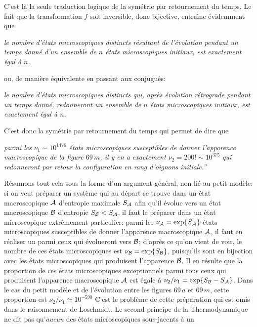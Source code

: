 C'est l\`a la seule traduction logique de la sym\'etrie par retournement 
du temps. Le fait que la transformation $f$ soit inversible, donc 
bijective, entra{\^\i}ne \'evidemment que 
\smallskip
{\sl
\noindent le nombre d'\'etats microscopiques distincts r\'esultant de 
l'\'evolution pendant un temps donn\'e d'un ensemble 
de $n$ \'etats microscopiques initiaux, est exactement \'egal \`a $n$.\par }
\medskip 
\noindent ou, de mani\`ere \'equivalente en passant aux conjugu\'es:
\smallskip
{\sl
\noindent le nombre d'\'etats microscopiques distincts qui, apr\`es 
\'evolution r\'etrograde pendant un temps donn\'e, redonneront un ensemble 
de $n$ \'etats microscopiques initiaux, est exactement \'egal \`a $n$. \par }
\medskip
C'est donc la sym\'etrie par retournement du temps qui permet de dire que
\smallskip
{\sl \noindent
parmi les $\nu_1 \sim 10^{1476}$ \'etats microscopiques susceptibles de
donner l'apparence macroscopique de la figure $69\, m$, il y en a exactement 
$\nu_2 = 200! \sim 10^{375}$ qui redonneront par retour la configuration 
en rang d'oignons initiale.''\par }
\medskip  
R\'esumons tout cela sous la forme d'un argument g\'en\'eral, non li\'e 
au petit mod\`ele: 
si on veut pr\'eparer un syst\`eme qui au d\'epart se trouve dans un 
\'etat macroscopique ${\cal A}$ d'entropie maximale $S_{\cal A}$ afin 
qu'il \'evolue vers un \'etat macroscopique ${\cal B}$ d'entropie 
$S_{\cal B} < S_{\cal A}$, il faut le pr\'eparer dans un \'etat 
microscopique extr\^emement particulier: parmi les $\nu_{\cal A} = 
\exp\{ S_{\cal A} \}$ \'etats microscopiques susceptibles de donner 
l'apparence macroscopique ${\cal A}$, il faut en r\'ealiser un parmi 
ceux qui \'evolueront vers ${\cal B}$; d'apr\`es ce qu'on vient de voir, 
le nombre de ces \'etats microscopiques est $\nu_{\cal B} = 
\exp\{ S_{\cal B} \}$, puisqu'ils sont en bijection avec les \'etats 
microscopiques qui produisent l'apparence ${\cal B}$.
\medskip
Il en r\'esulte que la proportion de ces \'etats microscopiques 
exceptionnels parmi tous ceux qui produisent l'apparence macroscopique 
${\cal A}$ est \'egale \`a $\nu_2 / \nu_1 = \exp\{ S_{\cal B} - 
S_{\cal A}\}$. Dans le cas du petit mod\`ele et de l'\'evolution entre 
les figures $69\, a$ et $69\, m$, cette proportion 
est  $\nu_2 / \nu_1 \simeq 10^{-590}$
\medskip
C'est le probl\`eme de cette pr\'eparation qui est omis dans 
le raisonnement de Loschmidt. Le second principe de la Thermodynamique 
ne dit pas qu'{\it aucun} des \'etats microscopiques sous-jacents \`a un 
